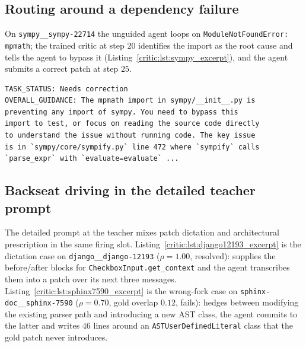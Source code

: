 \subsection{Routing around a dependency failure}
\label{critic:app:sandbox_adaptation}

On \texttt{sympy\_\_sympy-22714} the unguided agent loops on \texttt{ModuleNotFoundError: mpmath}; the trained critic at step $20$ identifies the import as the root cause and tells the agent to bypass it (Listing~\ref{critic:lst:sympy_excerpt}), and the agent submits a correct patch at step $25$.

\begin{lstlisting}[caption={Trained critic at agent step 20 on \texttt{sympy\_\_sympy-22714}.}, label={critic:lst:sympy_excerpt}]
TASK_STATUS: Needs correction
OVERALL_GUIDANCE: The mpmath import in sympy/__init__.py is
preventing any import of sympy. You need to bypass this
import to test, or focus on reading the source code directly
to understand the issue without running code. The key issue
is in `sympy/core/sympify.py` line 472 where `sympify` calls
`parse_expr` with `evaluate=evaluate` ...
\end{lstlisting}

\subsection{Backseat driving in the detailed teacher prompt}
\label{critic:app:backseat_driving}

The detailed prompt at the \criticopus{} teacher mixes patch dictation and architectural prescription in the same firing slot. Listing~\ref{critic:lst:django12193_excerpt} is the dictation case on \texttt{django\_\_django-12193} ($\rho{=}1.00$, resolved): \criticopus{} supplies the before/after blocks for \texttt{CheckboxInput.get\_context} and the agent transcribes them into a patch over its next three messages. Listing~\ref{critic:lst:sphinx7590_excerpt} is the wrong-fork case on \texttt{sphinx-doc\_\_sphinx-7590} ($\rho{=}0.70$, gold overlap $0.12$, fails): \criticopus{} hedges between modifying the existing parser path and introducing a new AST class, the agent commits to the latter and writes $46$ lines around an \texttt{ASTUserDefinedLiteral} class that the gold patch never introduces.

